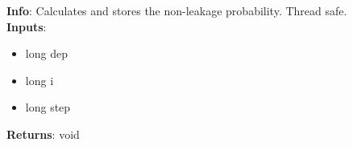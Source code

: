 \textbf{Info}: Calculates and stores the non-leakage probability. Thread safe.\\

\noindent \textbf{Inputs}:
\begin{itemize}
\item{long dep}
\item{long i}
\item{long step}
\end{itemize}

\noindent \textbf{Returns}: void
